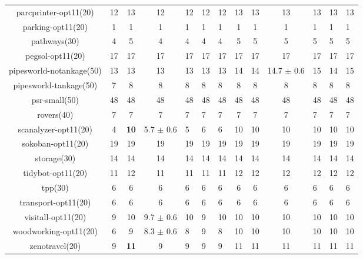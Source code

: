 \begin{center}
\begin{tabular}{|c|cccHHH|cccHHH|}
parcprinter-opt11(20) & 12 & 13 & 12 & 12 & 12 & 12 & 13 & 13 & 13 & 13 & 13 & 13\\
parking-opt11(20) & 1 & 1 & 1 & 1 & 1 & 1 & 1 & 1 & 1 & 1 & 1 & 1\\
pathways(30) & 4 & 5 & 4 & 4 & 4 & 4 & 5 & 5 & 5 & 5 & 5 & 5\\
pegsol-opt11(20) & 17 & 17 & 17 & 17 & 17 & 17 & 17 & 17 & 17 & 17 & 17 & 17\\
pipesworld-notankage(50) & 13 & 13 & 13 & 13 & 13 & 13 & 14 & 14 & 14.7 \(\pm\) 0.6 & 15 & 14 & 15\\
pipesworld-tankage(50) & 7 & 8 & 8 & 8 & 8 & 8 & 8 & 8 & 8 & 8 & 8 & 8\\
psr-small(50) & 48 & 48 & 48 & 48 & 48 & 48 & 48 & 48 & 48 & 48 & 48 & 48\\
rovers(40) & 7 & 7 & 7 & 7 & 7 & 7 & 7 & 7 & 7 & 7 & 7 & 7\\
scanalyzer-opt11(20) & 4 & \textbf{10} & 5.7 \(\pm\) 0.6 & 5 & 6 & 6 & 10 & 10 & 10 & 10 & 10 & 10\\
sokoban-opt11(20) & 19 & 19 & 19 & 19 & 19 & 19 & 19 & 19 & 19 & 19 & 19 & 19\\
storage(30) & 14 & 14 & 14 & 14 & 14 & 14 & 14 & 14 & 14 & 14 & 14 & 14\\
tidybot-opt11(20) & 11 & 12 & 11 & 11 & 11 & 11 & 12 & 12 & 12 & 12 & 12 & 12\\
tpp(30) & 6 & 6 & 6 & 6 & 6 & 6 & 6 & 6 & 6 & 6 & 6 & 6\\
transport-opt11(20) & 6 & 6 & 6 & 6 & 6 & 6 & 6 & 6 & 6 & 6 & 6 & 6\\
visitall-opt11(20) & 9 & 10 & 9.7 \(\pm\) 0.6 & 10 & 9 & 10 & 10 & 10 & 10 & 10 & 10 & 10\\
woodworking-opt11(20) & 6 & 9 & 8.3 \(\pm\) 0.6 & 8 & 9 & 8 & 10 & 10 & 10 & 10 & 10 & 10\\
zenotravel(20) & 9 & \textbf{11} & 9 & 9 & 9 & 9 & 11 & 11 & 11 & 11 & 11 & 11\\
\hline
\end{tabular}
\end{center}
